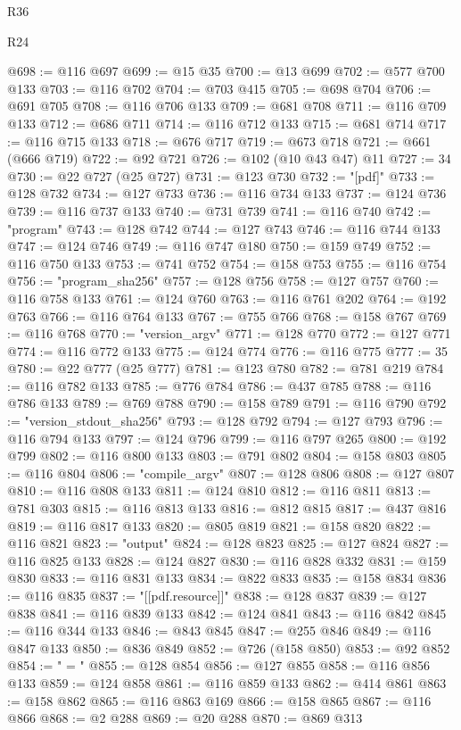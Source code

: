 \begin{lexlean}{R36}
\begin{lexlean}{R24}
\begin{coremodule}
{{{{{{{{{{{{{{{{{{{{{{{{{{{{{{{{{{{{{{{{{{{{{{{{{{{{{{{{{{{{{{{{{{{{{{{{{{{{{{{{{{{{{{{{{{{{{{{{{{{{{{{{{{{{{{{{{{{{{{{{{{{{{{{{{{{{{{{{{{{{{{{{{{{{{{{{{{{{{{{{{{{{{{{{{{{{{{{{{{{{{{{{{{{{{{{{{{{@698 := @116 @697
@699 := @15 @35
@700 := @13 @699
@702 := @577 @700 @133
@703 := @116 @702
@704 := @703 @415
@705 := @698 @704
@706 := @691 @705
@708 := @116 @706 @133
@709 := @681 @708
@711 := @116 @709 @133
@712 := @686 @711
@714 := @116 @712 @133
@715 := @681 @714
@717 := @116 @715 @133
@718 := @676 @717
@719 := @673 @718
@721 := @661 (@666 @719)
@722 := @92 @721
@726 := @102 (@10 @43 @47) @11
@727 := 34
@730 := @22 @727 (@25 @727)
@731 := @123 @730
@732 := "[pdf]"
@733 := @128 @732
@734 := @127 @733
@736 := @116 @734 @133
@737 := @124 @736
@739 := @116 @737 @133
@740 := @731 @739
@741 := @116 @740
@742 := "program"
@743 := @128 @742
@744 := @127 @743
@746 := @116 @744 @133
@747 := @124 @746
@749 := @116 @747 @180
@750 := @159 @749
@752 := @116 @750 @133
@753 := @741 @752
@754 := @158 @753
@755 := @116 @754
@756 := "program_sha256"
@757 := @128 @756
@758 := @127 @757
@760 := @116 @758 @133
@761 := @124 @760
@763 := @116 @761 @202
@764 := @192 @763
@766 := @116 @764 @133
@767 := @755 @766
@768 := @158 @767
@769 := @116 @768
@770 := "version_argv"
@771 := @128 @770
@772 := @127 @771
@774 := @116 @772 @133
@775 := @124 @774
@776 := @116 @775
@777 := 35
@780 := @22 @777 (@25 @777)
@781 := @123 @780
@782 := @781 @219
@784 := @116 @782 @133
@785 := @776 @784
@786 := @437 @785
@788 := @116 @786 @133
@789 := @769 @788
@790 := @158 @789
@791 := @116 @790
@792 := "version_stdout_sha256"
@793 := @128 @792
@794 := @127 @793
@796 := @116 @794 @133
@797 := @124 @796
@799 := @116 @797 @265
@800 := @192 @799
@802 := @116 @800 @133
@803 := @791 @802
@804 := @158 @803
@805 := @116 @804
@806 := "compile_argv"
@807 := @128 @806
@808 := @127 @807
@810 := @116 @808 @133
@811 := @124 @810
@812 := @116 @811
@813 := @781 @303
@815 := @116 @813 @133
@816 := @812 @815
@817 := @437 @816
@819 := @116 @817 @133
@820 := @805 @819
@821 := @158 @820
@822 := @116 @821
@823 := "output"
@824 := @128 @823
@825 := @127 @824
@827 := @116 @825 @133
@828 := @124 @827
@830 := @116 @828 @332
@831 := @159 @830
@833 := @116 @831 @133
@834 := @822 @833
@835 := @158 @834
@836 := @116 @835
@837 := "[[pdf.resource]]"
@838 := @128 @837
@839 := @127 @838
@841 := @116 @839 @133
@842 := @124 @841
@843 := @116 @842
@845 := @116 @344 @133
@846 := @843 @845
@847 := @255 @846
@849 := @116 @847 @133
@850 := @836 @849
@852 := @726 (@158 @850)
@853 := @92 @852
@854 := " = "
@855 := @128 @854
@856 := @127 @855
@858 := @116 @856 @133
@859 := @124 @858
@861 := @116 @859 @133
@862 := @414 @861
@863 := @158 @862
@865 := @116 @863 @169
@866 := @158 @865
@867 := @116 @866
@868 := @2 @288
@869 := @20 @288
@870 := @869 @313
}}}}}}}}}}}}}}}}}}}}}}}}}}}}}}}}}}}}}}}}}}}}}}}}}}}}}}}}}}}}}}}}}}}}}}}}}}}}}}}}}}}}}}}}}}}}}}}}}}}}}}}}}}}}}}}}}}}}}}}}}}}}}}}}}}}}}}}}}}}}}}}}}}}}}}}}}}}}}}}}}}}}}}}}}}}}}}}}}}}}}}}}}}}}}}}}}}}
\end{coremodule}
\end{lexlean}
\end{lexlean}

